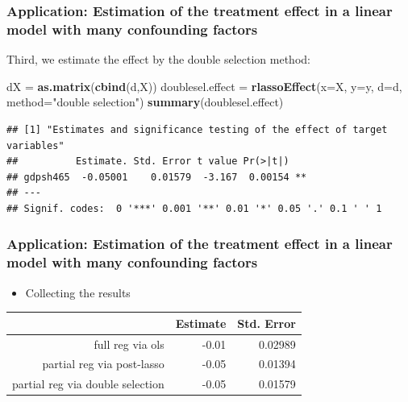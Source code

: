 \documentclass[
  shownotes,
  xcolor={svgnames},
  hyperref={colorlinks,citecolor=DarkBlue,linkcolor=DarkRed,urlcolor=DarkBlue}
  , aspectratio=169]{beamer}
\newenvironment{Shaded}{\begin{snugshade}}{\end{snugshade}}
\newcommand{\DataTypeTok}[1]{\textcolor[rgb]{0.13,0.29,0.53}{#1}}
\newcommand{\KeywordTok}[1]{\textcolor[rgb]{0.13,0.29,0.53}{\textbf{#1}}}
\newcommand{\NormalTok}[1]{#1}
\newcommand{\StringTok}[1]{\textcolor[rgb]{0.31,0.60,0.02}{#1}}
\begin{document}
\begin{frame}[fragile]
\frametitle{Application: Estimation of the treatment effect in a linear model with many confounding factors}

Third, we estimate the effect by the double selection method:

\begin{Shaded}
\begin{Highlighting}[]
\NormalTok{dX =}\StringTok{ }\KeywordTok{as.matrix}\NormalTok{(}\KeywordTok{cbind}\NormalTok{(d,X))}
\NormalTok{doublesel.effect =}\StringTok{ }\KeywordTok{rlassoEffect}\NormalTok{(}\DataTypeTok{x=}\NormalTok{X, }\DataTypeTok{y=}\NormalTok{y, }\DataTypeTok{d=}\NormalTok{d, }\DataTypeTok{method=}\StringTok{"double selection"}\NormalTok{)}
\KeywordTok{summary}\NormalTok{(doublesel.effect)}
\end{Highlighting}
\end{Shaded}

\begin{verbatim}
## [1] "Estimates and significance testing of the effect of target variables"
##          Estimate. Std. Error t value Pr(>|t|)   
## gdpsh465  -0.05001    0.01579  -3.167  0.00154 **
## ---
## Signif. codes:  0 '***' 0.001 '**' 0.01 '*' 0.05 '.' 0.1 ' ' 1
\end{verbatim}


\end{frame}
\begin{frame}[fragile]
\frametitle{Application: Estimation of the treatment effect in a linear model with many confounding factors}

\begin{itemize}
\item Collecting the results
\end{itemize}
\bigskip
\bigskip

\begin{table}[ht]
\centering
\begin{tabular}{rrr}
  \hline
 & Estimate & Std. Error \\ 
  \hline
full reg via ols & -0.01 & 0.02989 \\ 
  partial reg
via post-lasso  & -0.05 & 0.01394 \\ 
  partial reg via double selection & -0.05 & 0.01579 \\ 
   \hline
\end{tabular}
\end{table}

\end{frame}
\end{document}
